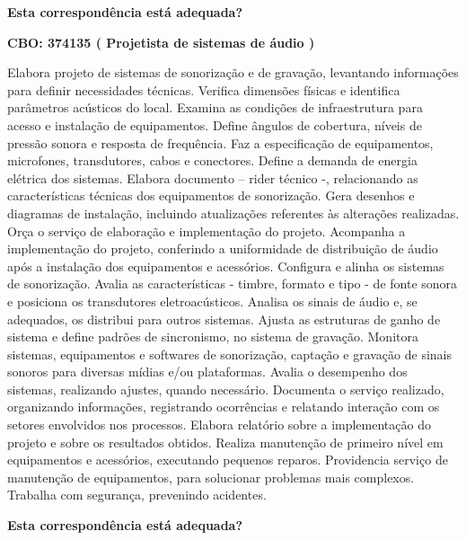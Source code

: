 \documentclass[
]{article}
\begin{document}
\begin{Form}
\textbf{Esta correspondência está adequada?} \\ 
\end{Form}

\textbf{CBO: 374135  ( Projetista de sistemas de áudio )}

Elabora projeto de sistemas de sonorização e de gravação, levantando
informações para definir necessidades técnicas. Verifica dimensões
físicas e identifica parâmetros acústicos do local. Examina as condições
de infraestrutura para acesso e instalação de equipamentos. Define
ângulos de cobertura, níveis de pressão sonora e resposta de frequência.
Faz a especificação de equipamentos, microfones, transdutores, cabos e
conectores. Define a demanda de energia elétrica dos sistemas. Elabora
documento -- rider técnico -, relacionando as características técnicas
dos equipamentos de sonorização. Gera desenhos e diagramas de
instalação, incluindo atualizações referentes às alterações realizadas.
Orça o serviço de elaboração e implementação do projeto. Acompanha a
implementação do projeto, conferindo a uniformidade de distribuição de
áudio após a instalação dos equipamentos e acessórios. Configura e
alinha os sistemas de sonorização. Avalia as características - timbre,
formato e tipo - de fonte sonora e posiciona os transdutores
eletroacústicos. Analisa os sinais de áudio e, se adequados, os
distribui para outros sistemas. Ajusta as estruturas de ganho de sistema
e define padrões de sincronismo, no sistema de gravação. Monitora
sistemas, equipamentos e softwares de sonorização, captação e gravação
de sinais sonoros para diversas mídias e/ou plataformas. Avalia o
desempenho dos sistemas, realizando ajustes, quando necessário.
Documenta o serviço realizado, organizando informações, registrando
ocorrências e relatando interação com os setores envolvidos nos
processos. Elabora relatório sobre a implementação do projeto e sobre os
resultados obtidos. Realiza manutenção de primeiro nível em equipamentos
e acessórios, executando pequenos reparos. Providencia serviço de
manutenção de equipamentos, para solucionar problemas mais complexos.
Trabalha com segurança, prevenindo acidentes.

\begin{Form}
\textbf{Esta correspondência está adequada?} \\ 
\end{Form}
\end{document}
